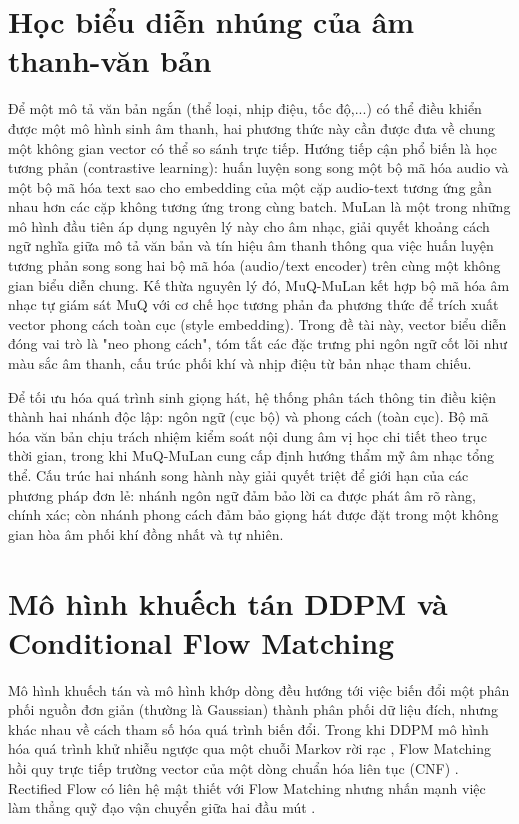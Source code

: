 \documentclass[a4paper,13pt,oneside]{report}
\begin{document}
\section{Học biểu diễn nhúng của âm thanh-văn bản}

Để một mô tả văn bản ngắn (thể loại, nhịp điệu, tốc độ,...) có thể điều khiển được một mô hình sinh âm thanh, hai phương thức này cần được đưa về chung một không gian vector có thể so sánh trực tiếp. Hướng tiếp cận phổ biến là học tương phản (contrastive learning): huấn luyện song song một bộ mã hóa audio và một bộ mã hóa text sao cho embedding của một cặp audio-text tương ứng gần nhau hơn các cặp không tương ứng trong cùng batch. MuLan \cite{mulan} là một trong những mô hình đầu tiên áp dụng nguyên lý này cho âm nhạc, giải quyết khoảng cách ngữ nghĩa giữa mô tả văn bản và tín hiệu âm thanh thông qua việc huấn luyện tương phản song song hai bộ mã hóa (audio/text encoder) trên cùng một không gian biểu diễn chung. Kế thừa nguyên lý đó, MuQ-MuLan \cite{muq} kết hợp bộ mã hóa âm nhạc tự giám sát MuQ với cơ chế học tương phản đa phương thức để trích xuất vector phong cách toàn cục (style embedding). Trong đề tài này, vector biểu diễn đóng vai trò là "neo phong cách", tóm tắt các đặc trưng phi ngôn ngữ cốt lõi như màu sắc âm thanh, cấu trúc phối khí và nhịp điệu từ bản nhạc tham chiếu.

Để tối ưu hóa quá trình sinh giọng hát, hệ thống phân tách thông tin điều kiện thành hai nhánh độc lập: ngôn ngữ (cục bộ) và phong cách (toàn cục). Bộ mã hóa văn bản chịu trách nhiệm kiểm soát nội dung âm vị học chi tiết theo trục thời gian, trong khi MuQ-MuLan cung cấp định hướng thẩm mỹ âm nhạc tổng thể. Cấu trúc hai nhánh song hành này giải quyết triệt để giới hạn của các phương pháp đơn lẻ: nhánh ngôn ngữ đảm bảo lời ca được phát âm rõ ràng, chính xác; còn nhánh phong cách đảm bảo giọng hát được đặt trong một không gian hòa âm phối khí đồng nhất và tự nhiên.

\section{Mô hình khuếch tán DDPM và Conditional Flow Matching}
\label{sec:ddpm_cfm}

Mô hình khuếch tán và mô hình khớp dòng đều hướng tới việc biến đổi một phân phối nguồn đơn giản (thường là Gaussian) thành phân phối dữ liệu đích, nhưng khác nhau về cách tham số hóa quá trình biến đổi. Trong khi DDPM mô hình hóa quá trình khử nhiễu ngược qua một chuỗi Markov rời rạc \cite{ddpm}, Flow Matching hồi quy trực tiếp trường vector của một dòng chuẩn hóa liên tục (CNF) \cite{flowmatching}. Rectified Flow có liên hệ mật thiết với Flow Matching nhưng nhấn mạnh việc làm thẳng quỹ đạo vận chuyển giữa hai đầu mút \cite{rectifiedflow}.
\end{document}
